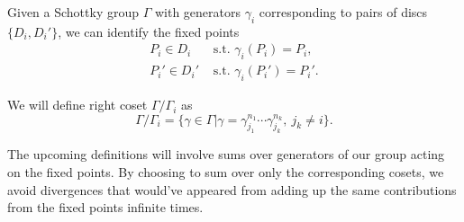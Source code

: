 \begin{definition}
    Given a Schottky group $\Gamma$ with generators $\gamma_i$ corresponding to pairs of discs $\{D_i,D_i'\}$,
    we can identify the fixed points
    \begin{align}
        P_i \in D_i & \text{ s.t. } \gamma_i(P_i)=P_i, \\
        P_i' \in D_i' & \text{ s.t. } \gamma_i(P_i')=P_i'.
    \end{align}

    We will define right coset $\Gamma / \Gamma_i$ as
    \begin{equation}
        \Gamma / \Gamma_i = \{\gamma \in \Gamma | \gamma = \gamma_{j_1}^{n_1} \cdots \gamma_{j_k}^{n_k}, \ j_k \neq i\}.
    \end{equation}
\end{definition}

The upcoming definitions will involve sums over generators of our group acting on the fixed points.
By choosing to sum over only the corresponding cosets, we avoid divergences that would've appeared from adding up the same contributions from the fixed points infinite times.

